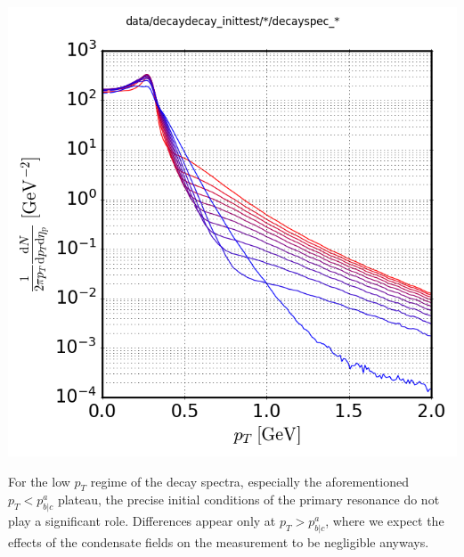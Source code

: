 {\begin{minipage}{\linewidth}
{\begin{minipage}{0.45\linewidth}
                \includegraphics[width=\linewidth]{code/C++/DCCspec/data/images/decaydecay_inittest_decayspecs.png}        
            \end{minipage}
        }
        \label{fig:decayspec_inittest}
    \end{minipage}
}
For the low $p_T$ regime of the decay spectra, especially the aforementioned ${p_T<p^a_{b\vert c}}$ plateau, the precise initial conditions of the primary resonance do not play a significant role. Differences appear only at ${p_T>p^a_{b\vert c}}$, where we expect the effects of the condensate fields on the measurement to be negligible anyways.





